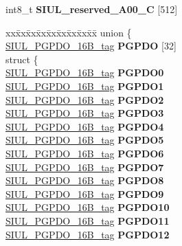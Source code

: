\begin{DoxyCompactItemize}
\begin{tabbing}
\end{tabbing}\item 
\mbox{\label{structSIU__tag_a71310826a91fe81f508ed3f31486784a}} 
int8\+\_\+t {\bfseries S\+I\+U\+L\+\_\+reserved\+\_\+A00\+\_\+C} \mbox{[}512\mbox{]}
\item 
\mbox{\label{structSIU__tag_a3b2140e03859e3789cfe69834604b9ab}} 
\begin{tabbing}
xx\=xx\=xx\=xx\=xx\=xx\=xx\=xx\=xx\=\kill
union \{\\
\>\mbox{\hyperlink{unionSIUL__PGPDO__16B__tag}{SIUL\_PGPDO\_16B\_tag}} {\bfseries PGPDO} \mbox{[}32\mbox{]}\\
\mbox{\label{unionSIU__tag_1_1_0D1546_a8709fdd5155889eb24c7f23ab0d22fc9}} 
\>struct \{\\
\>\>\mbox{\hyperlink{unionSIUL__PGPDO__16B__tag}{SIUL\_PGPDO\_16B\_tag}} {\bfseries PGPDO0}\\
\>\>\mbox{\hyperlink{unionSIUL__PGPDO__16B__tag}{SIUL\_PGPDO\_16B\_tag}} {\bfseries PGPDO1}\\
\>\>\mbox{\hyperlink{unionSIUL__PGPDO__16B__tag}{SIUL\_PGPDO\_16B\_tag}} {\bfseries PGPDO2}\\
\>\>\mbox{\hyperlink{unionSIUL__PGPDO__16B__tag}{SIUL\_PGPDO\_16B\_tag}} {\bfseries PGPDO3}\\
\>\>\mbox{\hyperlink{unionSIUL__PGPDO__16B__tag}{SIUL\_PGPDO\_16B\_tag}} {\bfseries PGPDO4}\\
\>\>\mbox{\hyperlink{unionSIUL__PGPDO__16B__tag}{SIUL\_PGPDO\_16B\_tag}} {\bfseries PGPDO5}\\
\>\>\mbox{\hyperlink{unionSIUL__PGPDO__16B__tag}{SIUL\_PGPDO\_16B\_tag}} {\bfseries PGPDO6}\\
\>\>\mbox{\hyperlink{unionSIUL__PGPDO__16B__tag}{SIUL\_PGPDO\_16B\_tag}} {\bfseries PGPDO7}\\
\>\>\mbox{\hyperlink{unionSIUL__PGPDO__16B__tag}{SIUL\_PGPDO\_16B\_tag}} {\bfseries PGPDO8}\\
\>\>\mbox{\hyperlink{unionSIUL__PGPDO__16B__tag}{SIUL\_PGPDO\_16B\_tag}} {\bfseries PGPDO9}\\
\>\>\mbox{\hyperlink{unionSIUL__PGPDO__16B__tag}{SIUL\_PGPDO\_16B\_tag}} {\bfseries PGPDO10}\\
\>\>\mbox{\hyperlink{unionSIUL__PGPDO__16B__tag}{SIUL\_PGPDO\_16B\_tag}} {\bfseries PGPDO11}\\
\>\>\mbox{\hyperlink{unionSIUL__PGPDO__16B__tag}{SIUL\_PGPDO\_16B\_tag}} {\bfseries PGPDO12}\\

\end{tabbing}
\end{DoxyCompactItemize}
